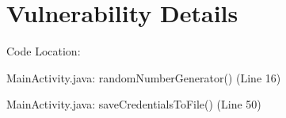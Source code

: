 

  






\section{Vulnerability Details}


Code Location:

MainActivity.java: randomNumberGenerator() (Line 16)

MainActivity.java: saveCredentialsToFile() (Line 50)

